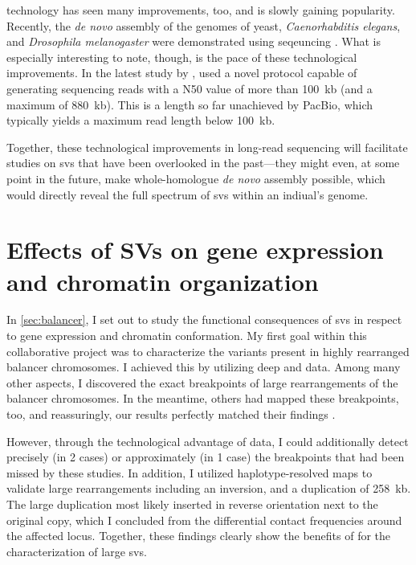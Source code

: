 \ont technology has seen many improvements, too, and is slowly gaining
popularity. Recently, the \textit{de novo} assembly of the genomes of yeast,
\textit{Caenorhabditis elegans}, and \textit{Drosophila melanogaster} were
demonstrated using \ont seqeuncing \citep{Istace2017,Tyson2017,Solares2018}.
What is especially interesting to note, though, is the pace of these technological
improvements. In the latest study by \ont, \citet{Jain2018} used a novel protocol
capable of generating sequencing reads with a N50 value of more than 100~kb
(and a maximum of 880~kb). This is a length so far unachieved by PacBio, which
typically yields a maximum read length below 100~kb.

Together, these technological improvements in long-read sequencing will facilitate
studies on \acp{sv} that have been overlooked in the past---they might even, at some point in the future,
make whole-homologue \emph{de novo} assembly possible, which would directly reveal the full spectrum
of \acp{sv} within an indiual's genome.




\section{Effects of SVs on gene expression and chromatin organization}

In \cref{sec:balancer}, I set out to study the functional consequences of
\acp{sv} in respect to gene expression and chromatin conformation. My first goal
within this collaborative project was to characterize the variants present in
highly rearranged balancer chromosomes. I achieved this by utilizing deep \wgs
and \hic data. Among many other aspects, I discovered the exact breakpoints of
large rearrangements of the balancer chromosomes. In the meantime, others had
mapped these breakpoints, too, and reassuringly, our results perfectly matched
their findings \citep{Miller2016,Miller2018}.

However, through the technological
advantage of \hic data, I could additionally detect precisely (in 2
cases) or approximately (in 1 case) the breakpoints that had been missed by
these studies. In addition, I utilized haplotype-resolved \hic maps to validate
large rearrangements including an inversion, and a duplication of 258~kb. The
large duplication most likely inserted in reverse orientation next to the
original copy, which I concluded from the differential contact frequencies
around the affected locus. Together, these findings clearly show the benefits
of \hic for the characterization of large \acp{sv}.

